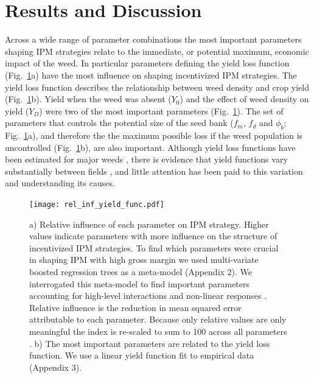\documentclass[9pt,twocolumn,twoside,lineno]{pnas-new}
\begin{document}
\section*{Results and Discussion}
Across a wide range of parameter combinations the most important parameters shaping IPM strategies relate to the immediate, or potential maximum, economic impact of the weed. In particular parameters defining the yield loss function (Fig.\ \ref{fig:rel_inf}a) have the most influence on shaping incentivized IPM strategies. The yield loss function describes the relationship between weed density and crop yield (Fig.\ \ref{fig:rel_inf}b). Yield when the weed was absent ($Y_0$) and the effect of weed density on yield ($Y_D$) were two of the most important parameters (Fig.\ \ref{fig:rel_inf}). The set of parameters that controls the potential size of the seed bank ($f_m$, $f_d$ and $\phi_b$; Fig.\ \ref{fig:rel_inf}a), and therefore the the maximum possible loss if the weed population is uncontrolled (Fig.\ \ref{fig:rel_inf}b), are also important. Although yield loss functions have been estimated for major weeds \citep{Cous1985, Doyl1986, Swin1994}, there is evidence that yield functions vary substantially between fields \citep{Swin1994, Hick2018}, and little attention has been paid to this variation and understanding its causes.
 \begin{figure}
	\centering
	\texttt{[image: rel\_inf\_yield\_func.pdf]}
	\caption{a) Relative influence of each parameter on IPM strategy. Higher values indicate parameters with more influence on the structure of incentivized IPM strategies. To find which parameters were crucial in shaping IPM with high gross margin we used multi-variate boosted regression trees \citep{Mill2016} as a meta-model \citep{Cout2014}(Appendix 2). We interrogated this meta-model to find important parameters accounting for high-level interactions and non-linear responses \citep{Frie2001, Mill2016}. Relative influence is the reduction in mean squared error attributable to each parameter. Because only relative values are only meaningful the index is re-scaled to sum to 100 across all parameters \citep{Frie2001}. b) The most important parameters are related to the yield loss function. We use a linear yield function fit to empirical data (Appendix 3).}
	\label{fig:rel_inf} 
\end{figure}
\end{document}

